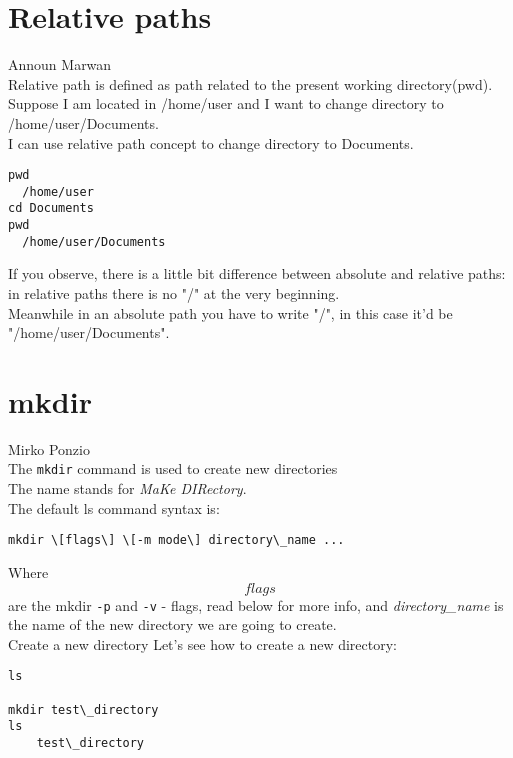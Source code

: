 \documentclass[hidelinks,12pt,a4paper,numbers=enddot]{scrartcl}
\begin{document}
\section{Relative paths}


\large Announ Marwan \normalsize\\



Relative path is defined as path related to the present working directory(pwd).\\
Suppose I am located in /home/user and I want to change directory to /home/user/Documents.\\
I can use relative path concept to change directory to Documents.

\begin{verbatim}
pwd
  /home/user
cd Documents
pwd
  /home/user/Documents
\end{verbatim}

If you observe, there is a little bit difference between absolute and relative paths:
in relative paths there is no "/" at the very beginning.\\
Meanwhile in an absolute path you have to write "/", in this case it'd be "/home/user/Documents".

\section{mkdir}


\large Mirko Ponzio \normalsize\\





The \texttt{mkdir} command is used to create new directories\\
The name stands for \emph{MaKe DIRectory}.\\

The default ls command syntax is:

\begin{verbatim}
mkdir \[flags\] \[-m mode\] directory\_name ...
\end{verbatim}

Where \[flags\] are the mkdir \texttt{-p} and \texttt{-v} - flags,
read below for more info, and \emph{directory\_name} is the
name of the new directory we are going to create.\\

Create a new directory
Let's see how to create a new directory:

\begin{verbatim}
ls

mkdir test\_directory
ls
    test\_directory
\end{verbatim}
\end{document}
